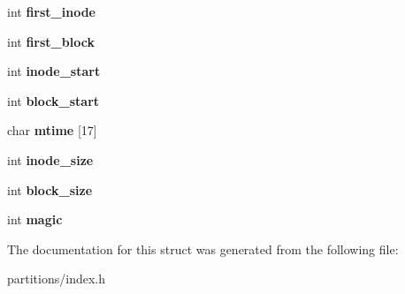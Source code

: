 \begin{DoxyCompactItemize}
int {\bfseries first\+\_\+inode}
\item 
\mbox{\label{structSuperBlock_aa4e773421dda558a0bde1532c765d82d}} 
int {\bfseries first\+\_\+block}
\item 
\mbox{\label{structSuperBlock_a034e685f4ccd15a996526b766fff91ab}} 
int {\bfseries inode\+\_\+start}
\item 
\mbox{\label{structSuperBlock_a9e42fe4ad8acfb3a9a471a0ceef0af14}} 
int {\bfseries block\+\_\+start}
\item 
\mbox{\label{structSuperBlock_a43344a600d266d8c0bc15efd7f617c0c}} 
char {\bfseries mtime} \mbox{[}17\mbox{]}
\item 
\mbox{\label{structSuperBlock_aa195114e5e07c75151acb24ada978445}} 
int {\bfseries inode\+\_\+size}
\item 
\mbox{\label{structSuperBlock_ade60440eedcf24d3cfeda6f77b28aa07}} 
int {\bfseries block\+\_\+size}
\item 
\mbox{\label{structSuperBlock_ac40417734d2d18545ffbf5bfe556112c}} 
int {\bfseries magic}
\end{DoxyCompactItemize}


The documentation for this struct was generated from the following file\+:\begin{DoxyCompactItemize}
\item 
partitions/index.\+h\end{DoxyCompactItemize}
